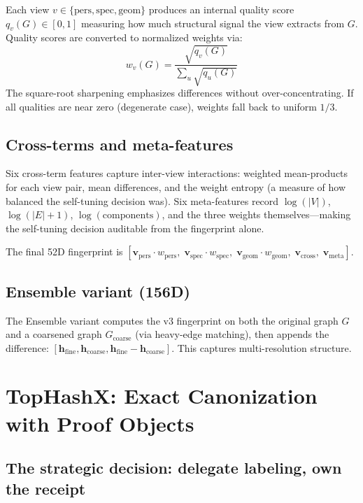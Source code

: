 \documentclass[11pt]{article}
\begin{document}
Each view $v \in \{\text{pers}, \text{spec}, \text{geom}\}$ produces an internal quality score $q_v(G) \in [0, 1]$ measuring how much structural signal the view extracts from $G$. Quality scores are converted to normalized weights via:
\begin{equation}
w_v(G) = \frac{\sqrt{q_v(G)}}{\sum_u \sqrt{q_u(G)}}
\end{equation}
The square-root sharpening emphasizes differences without over-concentrating. If all qualities are near zero (degenerate case), weights fall back to uniform $1/3$.

\subsection{Cross-terms and meta-features}

Six cross-term features capture inter-view interactions: weighted mean-products for each view pair, mean differences, and the weight entropy (a measure of how balanced the self-tuning decision was). Six meta-features record $\log(|V|)$, $\log(|E|+1)$, $\log(\text{components})$, and the three weights themselves---making the self-tuning decision auditable from the fingerprint alone.

The final 52D fingerprint is $[\mathbf{v}_\text{pers} \cdot w_\text{pers},\; \mathbf{v}_\text{spec} \cdot w_\text{spec},\; \mathbf{v}_\text{geom} \cdot w_\text{geom},\; \mathbf{v}_\text{cross},\; \mathbf{v}_\text{meta}]$.

\subsection{Ensemble variant (156D)}

The Ensemble variant computes the v3 fingerprint on both the original graph $G$ and a coarsened graph $G_\text{coarse}$ (via heavy-edge matching), then appends the difference: $[\mathbf{h}_\text{fine}, \mathbf{h}_\text{coarse}, \mathbf{h}_\text{fine} - \mathbf{h}_\text{coarse}]$. This captures multi-resolution structure.

\section{TopHashX: Exact Canonization with Proof Objects}

\subsection{The strategic decision: delegate labeling, own the receipt}
\end{document}
